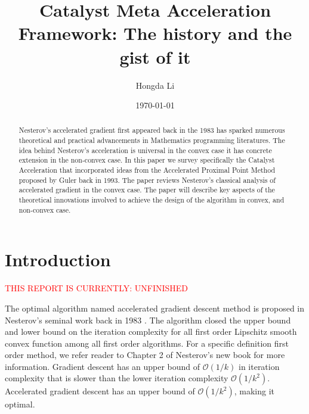 \documentclass[12pt]{article}
\begin{document}
\title{
    {
        \selectfont 
        Catalyst Meta Acceleration Framework: The history and the gist of it
    }
    }

\author{
    Hongda Li
}

\date{\today}

\maketitle


\begin{abstract} 
    \noindent
    Nesterov's accelerated gradient first appeared back in the 1983 has sparked numerous theoretical and practical advancements in Mathematics programming literatures. 
    The idea behind Nesterov's acceleration is universal in the convex case it has concrete extension in the non-convex case. 
    In this paper we survey specifically the Catalyst Acceleration that incorporated ideas from the Accelerated Proximal Point Method proposed by Guler back in 1993. 
    The paper reviews Nesterov's classical analysis of accelerated gradient in the convex case.
    The paper will describe key aspects of the theoretical innovations involved to achieve the design of the algorithm in convex, and non-convex case. 
    
\end{abstract}


\section{Introduction}
    \textcolor{red}{THIS REPORT IS CURRENTLY: UNFINISHED}

    The optimal algorithm named accelerated gradient descent method is proposed in Nesterov's seminal work back in 1983 \cite{nesterov_method_1983}. 
    The algorithm closed the upper bound and lower bound on the iteration complexity for all first order Lipschitz smooth convex function among all first order algorithms. 
    For a specific definition first order method, we refer reader to Chapter 2 of Nesterov's new book \cite{nesterov_lectures_2018} for more information. 
    Gradient descent has an upper bound of $\mathcal O(1/k)$ in iteration complexity that is slower than
    the lower iteration complexity $\mathcal O(1/k^2)$. 
    Accelerated gradient descent has an upper bound of $\mathcal O(1/k^2)$, making it optimal. 
\end{document}
